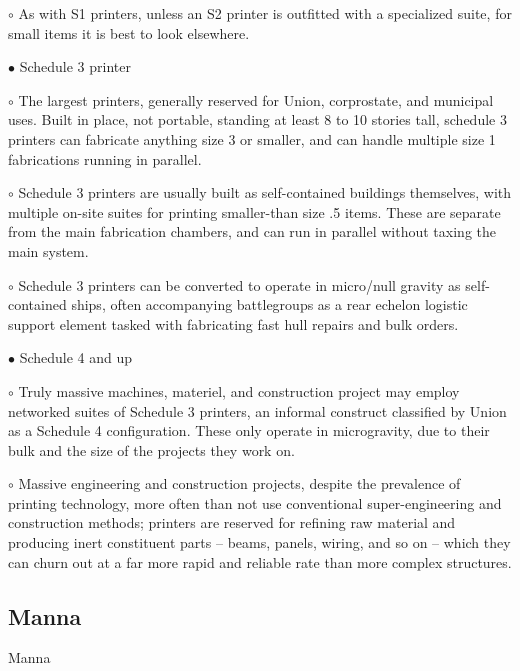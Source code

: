          $\circ$     As with S1 printers, unless an S2 printer is outfitted with a specialized suite, for  
             small items it is best to look elsewhere.   
 
$\bullet$    Schedule 3 printer 
 
         $\circ$     The largest printers, generally reserved for Union, corprostate, and municipal  
             uses. Built in place, not portable, standing at least 8 to 10 stories tall, schedule 3  
             printers can fabricate anything size 3 or smaller, and can handle multiple size 1  
             fabrications running in parallel. 
 
         $\circ$     Schedule 3 printers are usually built as self-contained buildings themselves, with  
             multiple on-site suites for printing smaller-than size .5 items. These are separate  
             from the main fabrication chambers, and can run in parallel without taxing the  
             main system. 
 
         $\circ$     Schedule 3 printers can be converted to operate in micro/null gravity as self- 
             contained ships, often accompanying battlegroups as a rear echelon logistic  
             support element tasked with fabricating fast hull repairs and bulk orders.  
 
$\bullet$    Schedule 4 and up
 
         $\circ$   Truly massive machines, materiel, and construction project may employ  
             networked suites of Schedule 3 printers, an informal construct classified by Union  
             as a Schedule 4 configuration. These only operate in microgravity, due to their  
             bulk and the size of the projects they work on. 
 
         $\circ$     Massive engineering and construction projects, despite the prevalence of printing  
             technology, more often than not use conventional super-engineering and  
             construction methods; printers are reserved for refining raw material and  
             producing inert constituent parts -- beams, panels, wiring, and so on -- which they  
             can churn out at a far more rapid and reliable rate than more complex structures. 
 

                                                                                                               

\subsection{Manna}
Manna  

